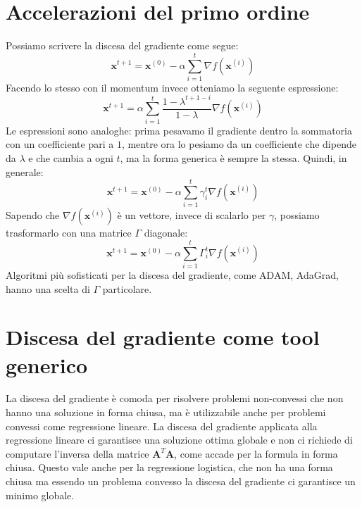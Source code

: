 \documentclass{article}
\begin{document}
    \section{Accelerazioni del primo ordine}
        Possiamo scrivere la discesa del gradiente come segue:
            \[\mathbf{x}^{t+1} = \mathbf{x}^{(0)} - \alpha \sum_{i=1}^t \nabla f(\mathbf{x}^{(i)})\]
        Facendo lo stesso con il momentum invece otteniamo la seguente espressione:
            \[ \mathbf{x}^{t+1} = \alpha \sum_{i=1}^t \frac{1-\lambda^{t+1-i}}{1-\lambda} \nabla f(\mathbf{x}^{(i)})\]
        Le espressioni sono analoghe: prima pesavamo il gradiente dentro la sommatoria con un coefficiente pari a $1$, 
        mentre ora lo pesiamo da un coefficiente che dipende da $\lambda$ e che cambia a ogni $t$, ma la forma generica è sempre 
        la stessa. Quindi, in generale:
        \[\mathbf{x}^{t+1} = \mathbf{x}^{(0)} - \alpha \sum_{i=1}^t \gamma_i^t \nabla f(\mathbf{x}^{(i)})\]
        Sapendo che $\nabla f(\mathbf{x}^{(i)})$ è un vettore, invece di scalarlo per $\gamma$, possiamo 
        trasformarlo con una matrice $\Gamma$ diagonale:
        \[\mathbf{x}^{t+1} = \mathbf{x}^{(0)} - \alpha \sum_{i=1}^t \Gamma_i^t \nabla f(\mathbf{x}^{(i)})\]
        Algoritmi più sofisticati per la discesa del gradiente, come ADAM, AdaGrad, hanno una scelta di $\Gamma$ particolare.

    \section{Discesa del gradiente come tool generico}
        La discesa del gradiente è comoda per risolvere problemi non-convessi che non hanno una soluzione in forma chiusa, ma è 
        utilizzabile anche per problemi convessi come regressione lineare. La discesa del gradiente applicata alla regressione 
        lineare ci garantisce una soluzione ottima globale e non ci richiede di computare l'inversa della matrice $\mathbf{A}^T\mathbf{A}$, come 
        accade per la formula in forma chiusa. Questo vale anche per la regressione logistica, che non ha una forma chiusa ma essendo un problema convesso 
        la discesa del gradiente ci garantisce un minimo globale.
\end{document}
